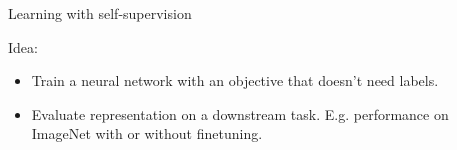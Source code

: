 \begin{frame}{Learning with self-supervision}

  Idea:
  \begin{itemize}
    \item Train a neural network with an objective that doesn't need labels.
    \item Evaluate representation on a downstream task. E.g. performance on ImageNet with or without finetuning.
  \end{itemize}


\end{frame}
